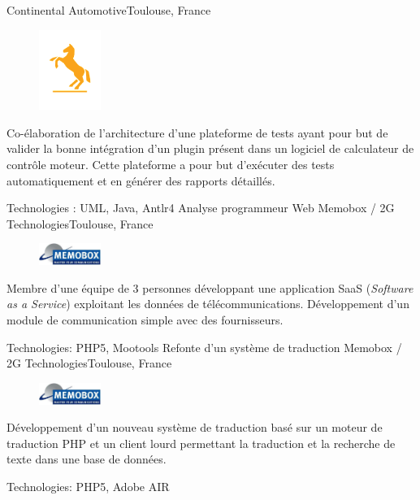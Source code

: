 \documentclass{my_cv_bis} \usepackage{wrapfig}
\begin{document}
	{Continental Automotive}{Toulouse, France}
	{
	\begin{minipage}{0.85\textwidth}
	\begin{figure}
		\vspace{-1cm}
		\includegraphics[width=2cm]{images/logos/continental.png}
	\end{figure}	
	Co-élaboration de l'architecture d'une plateforme de tests ayant pour but de valider la bonne intégration d'un plugin présent dans un logiciel de calculateur de contrôle moteur. Cette
	plateforme a pour but d'exécuter des tests automatiquement et en générer des rapports détaillés.
	\end{minipage}
	}
	{
	Technologies : UML, Java, Antlr4
	}
	\vspace{15px}
	{Analyse programmeur Web}
	{Memobox / 2G Technologies}{Toulouse, France}
	{%
	\begin{minipage}{0.85\textwidth}
	\begin{figure}
		\vspace{-0.5cm}
		\includegraphics[width=2cm]{images/logos/memobox.jpg}
	\end{figure}	
	Membre d'une équipe de 3 personnes développant une application SaaS (\textit{Software as a Service}) exploitant les données de télécommunications. 
	Développement d'un module de communication simple avec des fournisseurs.
	\end{minipage}
	} {Technologies: PHP5, Mootools}
	\vspace{15px}
	{ Refonte d’un système de traduction }
	{Memobox / 2G Technologies}{Toulouse, France}
	{
	\begin{minipage}{0.85\textwidth}
	\begin{figure}
		\vspace{-0.4cm}
		\includegraphics[width=2cm]{images/logos/memobox.jpg}
	\end{figure}	
	Développement d'un nouveau système de traduction basé sur un moteur de traduction PHP et un client lourd
	permettant la traduction et la recherche de texte dans une base de données.
	\end{minipage}
	} {Technologies: PHP5, Adobe AIR}
	
\end{document}
